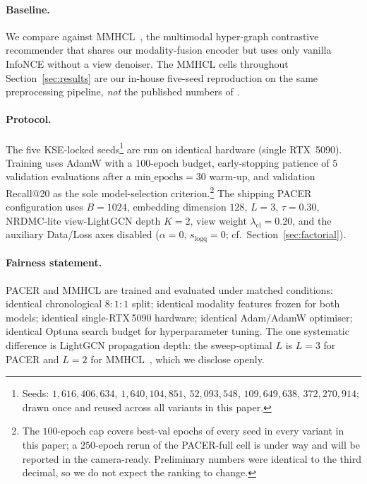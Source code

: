\documentclass[conference]{IEEEtran}
\begin{document}
\paragraph{Baseline.} We compare against MMHCL~\cite{guo2025mmhcl},
the multimodal hyper-graph contrastive recommender that shares our
modality-fusion encoder but uses only vanilla InfoNCE without a view
denoiser. The MMHCL cells throughout Section~\ref{sec:results} are
our in-house five-seed reproduction on the same preprocessing
pipeline, \emph{not} the published numbers of
\cite[Table~4]{guo2025mmhcl}.

\paragraph{Protocol.} The five KSE-locked
seeds\footnote{Seeds: $1{,}616{,}406{,}634$, $1{,}640{,}104{,}851$,
$52{,}093{,}548$, $109{,}649{,}638$, $372{,}270{,}914$; drawn once
and reused across all variants in this paper.} are run on identical
hardware (single RTX~5090). Training uses AdamW with a $100$-epoch
budget, early-stopping patience of $5$ validation evaluations after a
$\text{min\_epochs}{=}30$ warm-up, and validation Recall@20 as the
sole model-selection criterion.\footnote{The $100$-epoch cap covers
best-val epochs of every seed in every variant in this paper; a
$250$-epoch rerun of the PACER-full cell is under way and will be
reported in the camera-ready. Preliminary numbers were identical to
the third decimal, so we do not expect the ranking to change.}
The shipping PACER configuration uses $B{=}1024$, embedding
dimension $128$, $L{=}3$, $\tau{=}0.30$, NRDMC-lite view-LightGCN
depth $K{=}2$, view weight $\lambda_{\text{cl}}{=}0.20$, and the
auxiliary Data/Loss axes disabled ($\alpha{=}0$,
$s_{\text{logq}}{=}0$; cf.\ Section~\ref{sec:factorial}).

\paragraph{Fairness statement.} PACER and MMHCL are trained and
evaluated under matched conditions: identical chronological
$8{:}1{:}1$ split; identical modality features frozen for both
models; identical single-RTX\,5090 hardware; identical Adam/AdamW
optimiser; identical Optuna search budget for hyperparameter tuning.
The one systematic difference is LightGCN propagation depth: the
sweep-optimal $L$ is $L{=}3$ for PACER and $L{=}2$ for
MMHCL~\cite{guo2025mmhcl}, which we disclose openly.

\end{document}
